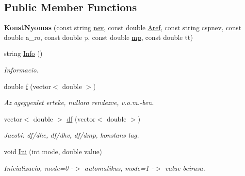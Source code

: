 \subsection*{Public Member Functions}
\begin{DoxyCompactItemize}
\item 
\mbox{\label{class_konst_nyomas_a729b5f380b7ea5792484e963b1383f34}} 
{\bfseries Konst\+Nyomas} (const string \hyperlink{class_agelem_abe92b7e3912367d5d1caf6b277ca0b7d}{nev}, const double \hyperlink{class_agelem_a3f8668febc2958fd539997d537552f17}{Aref}, const string cspnev, const double a\+\_\+ro, const double p, const double \hyperlink{class_agelem_a1377d80d8511cc4adacccba31d28282d}{mp}, const double tt)
\item 
\mbox{\label{class_konst_nyomas_a61f8d31204f60c216808fce1da451c30}} 
string \hyperlink{class_konst_nyomas_a61f8d31204f60c216808fce1da451c30}{Info} ()
\begin{DoxyCompactList}\small\item\em Informacio. \end{DoxyCompactList}\item 
\mbox{\label{class_konst_nyomas_a71a45ebdb2f27a8f69b9988f8ac5f50c}} 
double \hyperlink{class_konst_nyomas_a71a45ebdb2f27a8f69b9988f8ac5f50c}{f} (vector$<$ double $>$)
\begin{DoxyCompactList}\small\item\em Az agegyenlet erteke, nullara rendezve, v.\+o.\+m.-\/ben. \end{DoxyCompactList}\item 
\mbox{\label{class_konst_nyomas_ab8b056adc0788048a2b32f5378ef07b4}} 
vector$<$ double $>$ \hyperlink{class_konst_nyomas_ab8b056adc0788048a2b32f5378ef07b4}{df} (vector$<$ double $>$)
\begin{DoxyCompactList}\small\item\em Jacobi\+: df/dhe, df/dhv, df/dmp, konstans tag. \end{DoxyCompactList}\item 
\mbox{\label{class_konst_nyomas_a9f949a7c2430ade86328f9f0c5189797}} 
void \hyperlink{class_konst_nyomas_a9f949a7c2430ade86328f9f0c5189797}{Ini} (int mode, double value)
\begin{DoxyCompactList}\small\item\em Inicializacio, mode=0 -\/$>$ automatikus, mode=1 -\/$>$ value beirasa. \end{DoxyCompactList}\item 

\end{DoxyCompactItemize}
